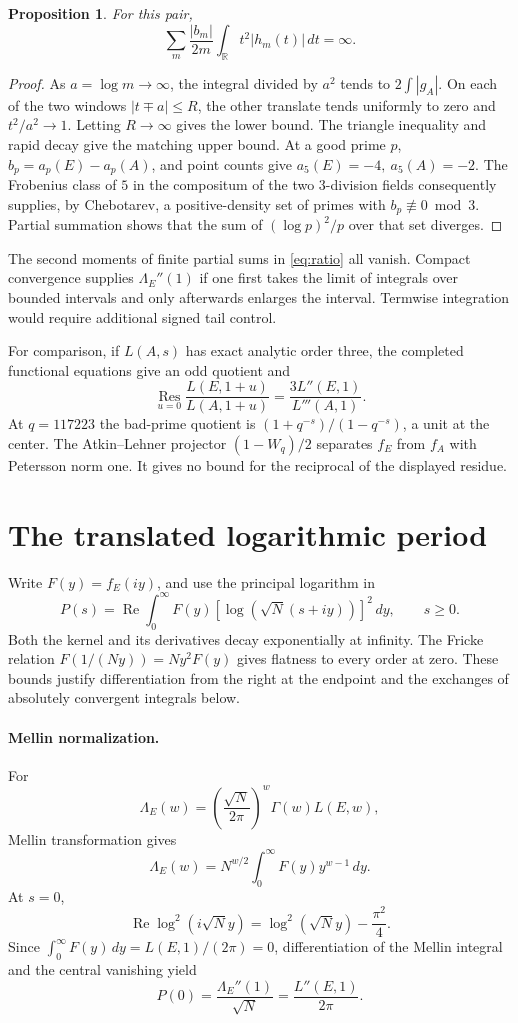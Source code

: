 \documentclass[11pt]{article}
\newtheorem{proposition}{Proposition}
\begin{document}
\begin{proposition}
For this pair,
\[
\sum_m\frac{|b_m|}{2m}\int_{\mathbb R}t^2|h_m(t)|\,dt=\infty .
\]
\end{proposition}
\begin{proof}
As \(a=\log m\to\infty\), the integral divided by \(a^2\) tends to
\(2\int|g_A|\). On each of the two windows \(|t\mp a|\le R\), the
other translate tends uniformly to zero and \(t^2/a^2\to1\).
Letting \(R\to\infty\) gives the lower bound. The triangle inequality
and rapid decay give the matching upper bound.
At a good prime \(p\), \(b_p=a_p(E)-a_p(A)\), and point counts give
\(a_5(E)=-4,\ a_5(A)=-2\). The Frobenius class of \(5\) in the
compositum of the two \(3\)-division fields consequently supplies, by
Chebotarev, a positive-density set of primes with \(b_p\not\equiv0
\bmod3\). Partial summation shows that the sum of
\((\log p)^2/p\) over that set diverges.
\end{proof}
The second moments of finite partial sums in \eqref{eq:ratio} all
vanish. Compact convergence supplies \(\Lambda_E''(1)\) if one first
takes the limit of integrals over bounded intervals and only afterwards
enlarges the interval. Termwise integration would require additional
signed tail control.

For comparison, if \(L(A,s)\) has exact analytic order three, the
completed functional equations give an odd quotient and
\[
\operatorname*{Res}_{u=0}\frac{L(E,1+u)}{L(A,1+u)}
=\frac{3L''(E,1)}{L'''(A,1)}.
\]
At \(q=117223\) the bad-prime quotient is \((1+q^{-s})/(1-q^{-s})\),
a unit at the center. The Atkin--Lehner projector \((1-W_q)/2\)
separates \(f_E\) from \(f_A\) with Petersson norm one. It gives no
bound for the reciprocal of the displayed residue.

\section{The translated logarithmic period}
Write \(F(y)=f_E(iy)\), and use the principal logarithm in
\[
P(s)=\operatorname{Re}\int_0^\infty F(y)
        [\log(\sqrt N(s+iy))]^2\,dy,\qquad s\ge0 .
\]
Both the kernel and its derivatives decay exponentially at infinity.
The Fricke relation \(F(1/(Ny))=Ny^2F(y)\) gives flatness to every
order at zero. These bounds justify differentiation from the right
at the endpoint and the exchanges of absolutely convergent integrals
below.
\paragraph{Mellin normalization.}
For
\[
 \Lambda_E(w)=
 \left(\frac{\sqrt N}{2\pi}\right)^w
 \Gamma(w)L(E,w),
\]
Mellin transformation gives
\[
 \Lambda_E(w)=N^{w/2}
       \int_0^\infty F(y)y^{w-1}\,dy.
\]
At \(s=0\),
\[
 \operatorname{Re}\log^2(i\sqrt N y)
 =\log^2(\sqrt N y)-\frac{\pi^2}{4}.
\]
Since
\(\int_0^\infty F(y)\,dy=L(E,1)/(2\pi)=0\),
differentiation of the Mellin integral and the central vanishing yield
\[
 \boxed{\displaystyle
 P(0)=\frac{\Lambda_E''(1)}{\sqrt N}
     =\frac{L''(E,1)}{2\pi}.}
\]
\end{document}
